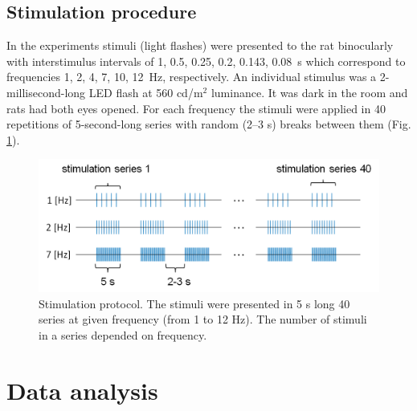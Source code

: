 \documentclass{pracalicmgr}
\begin{document}
   \section{Stimulation procedure}
   In the experiments stimuli (light flashes) were presented to the rat binocularly with interstimulus intervals of  1, 0.5, 0.25, 0.2, 0.143, 0.08~s which correspond to frequencies 1, 2, 4, 7, 10, 12~Hz, respectively. An individual stimulus was a 2-millisecond-long LED flash at 560 cd/m$^2$ luminance. It was dark in the room and rats had both eyes opened. For each frequency the stimuli were applied in 40 repetitions of 5-second-long series with random (2--3 s) breaks between them (Fig. \ref{rys:stimuli}).
   \begin{figure}[htbp]
   	\begin{center}
   		\includegraphics[scale=0.5]{paradigms.png}
   	\end{center}
   	\caption{ Stimulation protocol. The stimuli were presented in 5 s long 40 series at given frequency (from 1 to 12 Hz). The number of stimuli in a series depended on frequency.}
   	\label{rys:stimuli}
   \end{figure} 
   
   \chapter{Data analysis}
   
\end{document}
